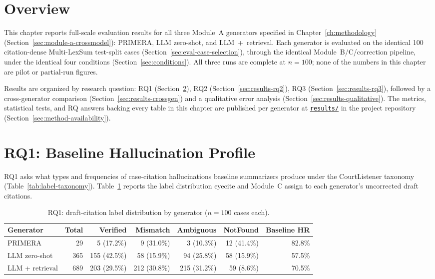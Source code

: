 \label{ch:results}

\section{Overview}
\label{sec:results-overview}

This chapter reports full-scale evaluation results for all three Module~A generators specified in Chapter~\ref{ch:methodology} (Section~\ref{sec:module-a-crossmodel}): PRIMERA, LLM zero-shot, and LLM~+~retrieval. Each generator is evaluated on the identical 100 citation-dense Multi-LexSum test-split cases (Section~\ref{sec:eval-case-selection}), through the identical Module~B/C/correction pipeline, under the identical four conditions (Section~\ref{sec:conditions}). All three runs are complete at $n=100$; none of the numbers in this chapter are pilot or partial-run figures.

Results are organized by research question: RQ1 (Section~\ref{sec:results-rq1}), RQ2 (Section~\ref{sec:results-rq2}), RQ3 (Section~\ref{sec:results-rq3}), followed by a cross-generator comparison (Section~\ref{sec:results-crossgen}) and a qualitative error analysis (Section~\ref{sec:results-qualitative}). The metrics, statistical tests, and RQ answers backing every table in this chapter are published per generator at \href{\repourl/tree/main/results}{\texttt{results/}} in the project repository (Section~\ref{sec:method-availability}).

\section{RQ1: Baseline Hallucination Profile}
\label{sec:results-rq1}

RQ1 asks what types and frequencies of case-citation hallucinations baseline summarizers produce under the CourtListener taxonomy (Table~\ref{tab:label-taxonomy}). Table~\ref{tab:rq1-labels} reports the label distribution eyecite and Module~C assign to each generator's uncorrected draft citations.

\begin{table}[!t]
\centering
\caption{RQ1: draft-citation label distribution by generator ($n=100$ cases each).}
\label{tab:rq1-labels}
\begin{tabular}{@{}lrrrrrr@{}}
\toprule
\textbf{Generator} & \textbf{Total} & \textbf{Verified} & \textbf{Mismatch} & \textbf{Ambiguous} & \textbf{NotFound} & \textbf{Baseline HR} \\
\midrule
PRIMERA          & 29  & 5 (17.2\%)   & 9 (31.0\%)   & 3 (10.3\%)   & 12 (41.4\%) & 82.8\% \\
LLM zero-shot     & 365 & 155 (42.5\%) & 58 (15.9\%)  & 94 (25.8\%)  & 58 (15.9\%) & 57.5\% \\
LLM + retrieval   & 689 & 203 (29.5\%) & 212 (30.8\%) & 215 (31.2\%) & 59 (8.6\%)  & 70.5\% \\
\bottomrule
\end{tabular}
\end{table}

